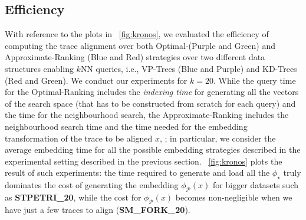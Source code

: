 \subsection{Efficiency}\label{subsec:efficio}
With reference to the plots in \figurename~\ref{fig:kronos}, we evaluated the efficiency of computing the trace alignment over both Optimal-({\color{ggplotPurple}Purple} and {\color{ggplotGreen}Green}) and Approximate-Ranking ({\color{ggplotBlue}Blue} and {\color{ggplotRed}Red}) strategies over two different data structures enabling $k$NN queries, i.e., VP-Trees ({\color{ggplotBlue}Blue} and {\color{ggplotPurple}Purple}) and KD-Trees ({\color{ggplotRed}Red} and {\color{ggplotGreen}Green}). We conduct our experiments for $k=20$. While the query time for the Optimal-Ranking includes the \textit{indexing time} for generating all the vectors of the search space (that has to be constructed from scratch for each query) and the time for the neighbourhood search, the Approximate-Ranking includes the neighbourhood search time and the time needed for the embedding transformation of the trace to be aligned $x$, ; in particular, we consider the average embedding time for all the possible embedding strategies described in the experimental setting described in the previous section. \figurename~\ref{fig:kronos} plots the result of such experiments: the time required to generate and load all the $\phi_\star$ truly dominates the cost of generating the embedding $\phi_{\mathcal{P}}(x)$ for bigger datasets such as \textbf{STPETRI\_20}, while the cost for $\phi_{\mathcal{P}}(x)$ becomes non-negligible when we have just a few traces to align (\textbf{SM\_FORK\_20}).
